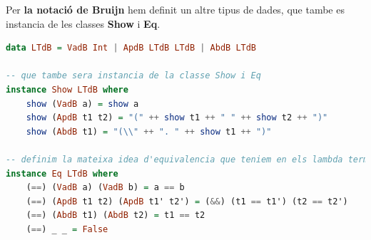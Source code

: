 \documentclass[10pt,a4paper]{article}
\begin{document}
Per \textbf{la notació de Bruijn} hem definit un altre tipus de dades, que tambe es instancia de les classes \textbf{Show} i \textbf{Eq}.

\begin{lstlisting}[language=Haskell]
data LTdB = VadB Int | ApdB LTdB LTdB | AbdB LTdB

-- que tambe sera instancia de la classe Show i Eq
instance Show LTdB where
    show (VadB a) = show a
    show (ApdB t1 t2) = "(" ++ show t1 ++ " " ++ show t2 ++ ")"
    show (AbdB t1) = "(\\" ++ ". " ++ show t1 ++ ")"

-- definim la mateixa idea d'equivalencia que teniem en els lambda termes pels lambda termes amb notacio de Bruijn
instance Eq LTdB where
    (==) (VadB a) (VadB b) = a == b
    (==) (ApdB t1 t2) (ApdB t1' t2') = (&&) (t1 == t1') (t2 == t2')
    (==) (AbdB t1) (AbdB t2) = t1 == t2
    (==) _ _ = False
\end{lstlisting}
\end{document}
